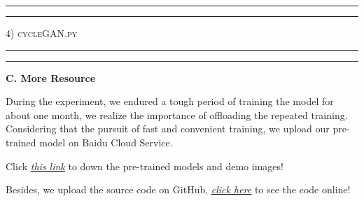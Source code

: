\documentclass[a4paper]{article}
\newcommand{\HRule}{\rule{\linewidth}{0.5mm}}
\renewcommand{\baselinestretch}{1.2}
\begin{document}
\noindent \HRule



\noindent \HRule

\vspace{1cm}

\noindent \LARGE \textsc{4) cycleGAN.py} \small

\noindent \HRule

 

\noindent \HRule

\clearpage
\renewcommand{\baselinestretch}{1.3}
\begin{center}
\large\textbf{C. More Resource} \\
\end{center}
\vspace{2mm}
\large{During the experiment, we endured a tough period of training the model for about one month, we realize the importance of offloading the repeated training. Considering that the pursuit of fast and convenient training, we upload our pre-trained model on Baidu Cloud Service. 

Click \href{https://pan.baidu.com/s/1qb6ye6ZszvrdTRdHItjuqg}{\underline{\textit{this link}}} to down the pre-trained models and demo images!

Besides, we upload the source code on GitHub, \href{https://github.com/LovelyBuggies/Jupyter_DeepLearning_Homework/tree/master/Cycle-GAN}{\underline{\textit{click here}}} to see the code online!
}
\end{document}
